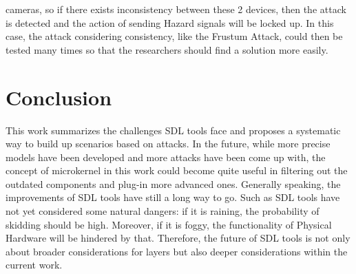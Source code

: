 \documentclass[conference]{IEEEtran}
\begin{document}
cameras, so if there exists inconsistency between these 2 devices, then the attack is detected and the action of sending Hazard signals will be locked up. In this case, the attack considering consistency, like the Frustum Attack, could then be tested many times so that the researchers should find a solution more easily.

\section{Conclusion}
This work summarizes the challenges SDL tools face and proposes a systematic way to build up scenarios based on attacks. In the future, while more precise models have been developed and more attacks have been come up with, the concept of microkernel in this work could become quite useful in filtering out the outdated components and plug-in more advanced ones. Generally speaking, the improvements of SDL tools have still a long way to go. Such as SDL tools have not yet considered some natural dangers: if it is raining, the probability of skidding should be high. Moreover, if it is foggy, the functionality of Physical Hardware will be hindered by that. Therefore, the future of SDL tools is not only about broader considerations for layers but also deeper considerations within the current work.
\end{document}
